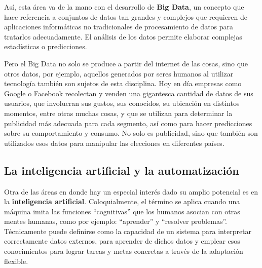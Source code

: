 Así, esta área va de la mano con el desarrollo de \textbf{Big Data}, un concepto
que hace referencia a conjuntos de datos tan grandes y complejos que requieren
de  aplicaciones informáticas no tradicionales de procesamiento de datos para
tratarlos adecuadamente. El análisis de los datos permite elaborar complejas
estadísticas o predicciones.\autocite[vid.]{warden_2011}

Pero el Big Data no solo se produce a partir del internet de las cosas, sino que
otros datos, por ejemplo, aquellos generados por seres humanos al utilizar
tecnología también son sujetos de esta disciplina. Hoy en día empresas como
Google o Facebook recolectan y venden una gigantesca cantidad de datos de sus
usuarios, que involucran sus gustos, sus conocidos, su ubicación en distintos
momentos, entre otras muchas cosas, y que se utilizan para determinar la
publicidad más adecuada para cada segmento, así como para hacer predicciones
sobre su comportamiento y consumo. No solo es publicidad, sino que también son
utilizados esos datos para manipular las elecciones en diferentes
países.\autocite{perfil_2018_03_20}

\subsection{La inteligencia artificial y la automatización}
\label{chap:historia_computadoras:subsec:ia}

Otra de las áreas en donde hay un especial interés dado su amplio potencial es
en la \textbf{inteligencia artificial}. Coloquialmente, el término se aplica
cuando una máquina imita las funciones ``cognitivas'' que los humanos asocian
con otras mentes humanas, como por ejemplo: ``aprender'' y ``resolver
problemas''. Técnicamente puede definirse como la capacidad de un sistema para
interpretar correctamente datos externos, para aprender de dichos datos y
emplear esos conocimientos para lograr tareas y metas concretas a través de la
adaptación flexible.\autocite{kaplan_2019}

